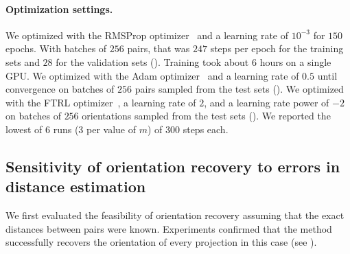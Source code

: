 \paragraph{Optimization settings.}
We optimized  with the RMSProp optimizer~\cite{tieleman2012rmsprop} and a learning rate of $10^{-3}$ for $150$ epochs.
With batches of $256$ pairs, that was $247$ steps per epoch for the training sets and $28$ for the validation sets ().
Training took about 6 hours  on a single GPU\@.
We optimized  with the Adam optimizer~\cite{kingma2014adam} and a learning rate of $0.5$ until convergence on batches of $256$ pairs sampled from the test sets ().
We optimized  with the FTRL optimizer~\cite{mcmahan2013ftrl}, a learning rate of $2$, and a learning rate power of $-2$ on batches of $256$ orientations sampled from the test sets ().
We reported the lowest of 6 runs (3 per value of $m$) of 300 steps each.


\subsection{Sensitivity of orientation recovery to errors in distance estimation}\label{sec:results:orientation-recovery:sensitivity}


We first evaluated the feasibility of orientation recovery assuming that the exact distances between pairs were known.
Experiments confirmed that the method successfully recovers the orientation of every projection in this case (see ).

